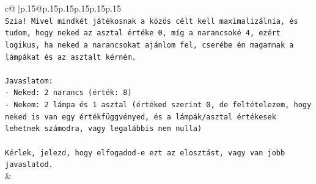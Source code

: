 \documentclass{article}
\begin{document}
{\begin{supertabular}{c@{$\;$}|p{.15\linewidth}@{}p{.15\linewidth}p{.15\linewidth}p{.15\linewidth}p{.15\linewidth}p{.15\linewidth}}
{{{\\ 
\texttt{Szia! Mivel mindkét játékosnak a közös célt kell maximalizálnia, és tudom, hogy neked az asztal értéke 0, míg a narancsoké 4, ezért logikus, ha neked a narancsokat ajánlom fel, cserébe én magamnak a lámpákat és az asztalt kérném.} \\
\\ 
\texttt{Javaslatom:} \\
\texttt{{-} Neked: 2 narancs (érték: 8)} \\
\texttt{{-} Nekem: 2 lámpa és 1 asztal (értéked szerint 0, de feltételezem, hogy neked is van egy értékfüggvényed, és a lámpák/asztal értékesek lehetnek számodra, vagy legalábbis nem nulla)} \\
\\ 
\texttt{Kérlek, jelezd, hogy elfogadod{-}e ezt az elosztást, vagy van jobb javaslatod.} \\
            }
        }
    }
    & \\ \\


\end{supertabular}}
\end{document}
